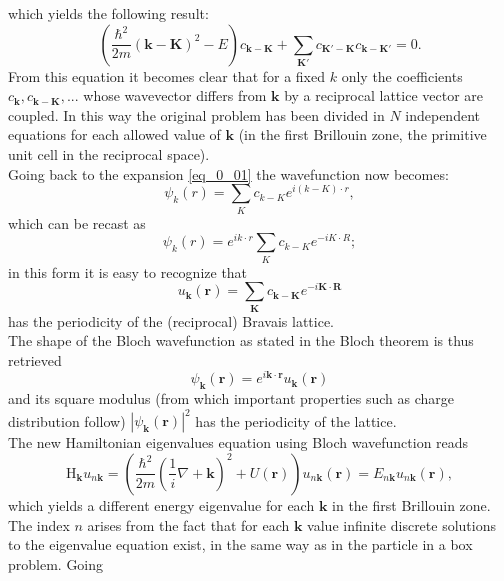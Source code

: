 which yields the following result:
\begin{equation}
    \left(\frac{\hbar^2}{2m}(\mathbf{k}-\mathbf{K})^2-E\right)c_{\mathbf{k}-\mathbf{K}}+\sum_{\mathbf{K}'}c_{\mathbf{K}'-\mathbf{K}}c_{\mathbf{k}-\mathbf{K}'}=0.
\end{equation}
From this equation it becomes clear that for a fixed $k$ only the coefficients $c_\mathbf{k},c_{\mathbf{k}-\mathbf{K}},...$ whose wavevector differs from 
$\mathbf{k}$ by a reciprocal lattice vector are coupled. In this way the original problem has been divided in $N$ independent equations for 
each allowed value of $\mathbf{k}$ (in the first Brillouin zone, the primitive unit cell in the reciprocal space).\\
Going back to the expansion \ref{eq_0_01} the wavefunction now becomes:
\begin{equation}
    \psi_k(r)=\sum_{K}c_{k-K}e^{i(k-K)\cdot r},
\end{equation}
which can be recast as 
\begin{equation}
    \psi_k(r)=e^{ik\cdot r}\sum_{K}c_{k-K}e^{-iK\cdot R};
\end{equation}
in this form it is easy to recognize that 
\begin{equation}
    u_\mathbf{k}(\mathbf{r})=\sum_\mathbf{K}c_{\mathbf{k}-\mathbf{K}}e^{-i\mathbf{K}\cdot\mathbf{R}}
\end{equation}
has the periodicity of the (reciprocal) Bravais lattice.\\
The shape of the Bloch wavefunction as stated in the Bloch theorem is thus retrieved
\begin{equation}
    \psi_\mathbf{k}(\mathbf{r})=e^{i\mathbf{k}\cdot \mathbf{r}}u_\mathbf{k}(\mathbf{r})
\end{equation}
and its square modulus (from which important properties such as charge distribution follow) $|\psi_\mathbf{k}(\mathbf{r})|^2$ has the periodicity of the
lattice.\\
The new Hamiltonian eigenvalues equation using Bloch wavefunction reads
\begin{equation}
    \mathrm{H}_\mathbf{k} u_{n\mathbf{k}}=\left(\frac{\hbar^2}{2m}\left(\frac{1}{i}\nabla+\mathbf{k}\right)^2+U(\mathbf{r})\right)u_{n\mathbf{k}}(\mathbf{r})=E_{n\mathbf{k}}u_{n\mathbf{k}}(\mathbf{r}),
\end{equation}
which yields a different energy eigenvalue for each $\mathbf{k}$ in the first Brillouin zone. The index $n$ arises from the fact that for 
each $\mathbf{k}$ value infinite discrete solutions to the eigenvalue equation exist, in the same way as in the particle in a box problem. Going 
